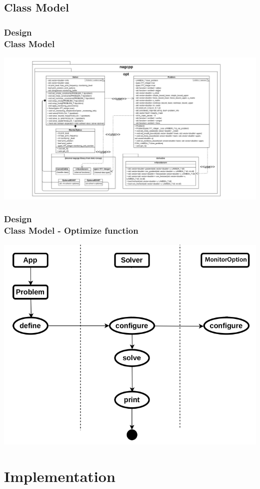 \documentclass[ucs,10pt]{beamer}
\begin{document}
\subsection{Class Model}

\begin{frame}
\frametitle{Design \\
\small \color{rwth-blue} Class Model}
\includegraphics[height=0.95\textheight]{class diagram.pdf}
\end{frame}

\begin{frame}
\frametitle{Design \\
\small \color{rwth-blue} Class Model - Optimize function}
\centering\includegraphics[height=0.95\textheight]{Class Model - Optimize function.pdf}
\end{frame}

\section{Implementation}
\end{document}
